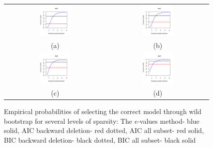 \begin{figure}
\begin{center}

\begin{tabular}{cc}
		\includegraphics[width=0.32\textwidth]{Chapter-evalue/simplot2}
	& 
		\includegraphics[width=0.32\textwidth]{Chapter-evalue/simplot4} \\
	(a) & (b) \\	
		\includegraphics[width=0.32\textwidth]{Chapter-evalue/simplot6}
	& 
		\includegraphics[width=0.32\textwidth]{Chapter-evalue/simplot8} \\
	(c) & (d) \\	
\end{tabular}

\caption{Empirical probabilities of selecting the correct model through wild bootstrap for several levels of sparsity:  The $e$-values method- blue solid, AIC backward deletion- red dotted, AIC all subset- red solid, BIC backward deletion- black dotted, BIC all subset- black solid}
\label{fig:simplotswild}

\end{center}
\end{figure}

